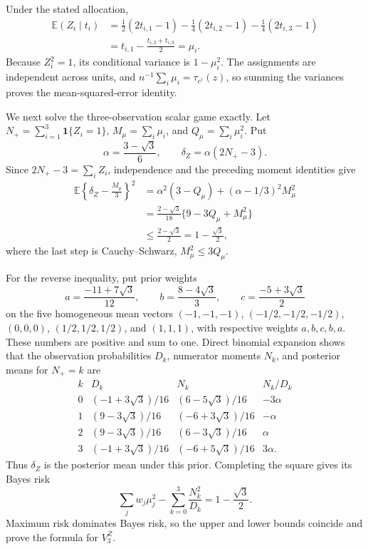 Under the stated allocation,
\[
 \begin{aligned}
 \mathbb E(Z_i\mid t_i)
 &=\frac12(2t_{i,1}-1)-\frac14(2t_{i,2}-1)-\frac14(2t_{i,3}-1)\\
 &=t_{i,1}-\frac{t_{i,2}+t_{i,3}}2=\mu_i.
 \end{aligned}
\]
Because \(Z_i^2=1\), its conditional variance is \(1-\mu_i^2\).  The assignments are independent across units, and \(n^{-1}\sum_i\mu_i=\tau_{c^\dagger}(z)\), so summing the variances proves the mean-squared-error identity.

We next solve the three-observation scalar game exactly.  Let \(N_+=\sum_{i=1}^3\mathbf1\{Z_i=1\}\), \(M_\mu=\sum_i\mu_i\), and \(Q_\mu=\sum_i\mu_i^2\).  Put
\[
 \alpha=\frac{3-\sqrt3}{6},
 \qquad \delta_Z=\alpha(2N_+-3).
\]
Since \(2N_+-3=\sum_iZ_i\), independence and the preceding moment identities give
\[
 \begin{aligned}
 \mathbb E\left\{\delta_Z-\frac{M_\mu}{3}\right\}^2
 &=\alpha^2(3-Q_\mu)+(\alpha-1/3)^2M_\mu^2\\
 &=\frac{2-\sqrt3}{18}\{9-3Q_\mu+M_\mu^2\}\\
 &\leq\frac{2-\sqrt3}{2}=1-\frac{\sqrt3}{2},
 \end{aligned}
\]
where the last step is Cauchy--Schwarz, \(M_\mu^2\leq3Q_\mu\).

For the reverse inequality, put prior weights
\[
 a=\frac{-11+7\sqrt3}{12},\qquad
 b=\frac{8-4\sqrt3}{3},\qquad
 c=\frac{-5+3\sqrt3}{2}
\]
on the five homogeneous mean vectors \((-1,-1,-1)\), \((-1/2,-1/2,-1/2)\), \((0,0,0)\), \((1/2,1/2,1/2)\), and \((1,1,1)\), with respective weights \(a,b,c,b,a\).  These numbers are positive and sum to one.  Direct binomial expansion shows that the observation probabilities \(D_k\), numerator moments \(N_k\), and posterior means for \(N_+=k\) are
\[
 \begin{array}{c|c|c|c}
 k&D_k&N_k&N_k/D_k\\ \hline
 0&(-1+3\sqrt3)/16&(6-5\sqrt3)/16&-3\alpha\\
 1&(9-3\sqrt3)/16&(-6+3\sqrt3)/16&-\alpha\\
 2&(9-3\sqrt3)/16&(6-3\sqrt3)/16&\alpha\\
 3&(-1+3\sqrt3)/16&(-6+5\sqrt3)/16&3\alpha.
 \end{array}
\]
Thus \(\delta_Z\) is the posterior mean under this prior.  Completing the square gives its Bayes risk
\[
 \sum_jw_j\mu_j^2-\sum_{k=0}^3\frac{N_k^2}{D_k}
 =1-\frac{\sqrt3}{2}.
\]
Maximum risk dominates Bayes risk, so the upper and lower bounds coincide and prove the formula for \(V_3^Z\).

